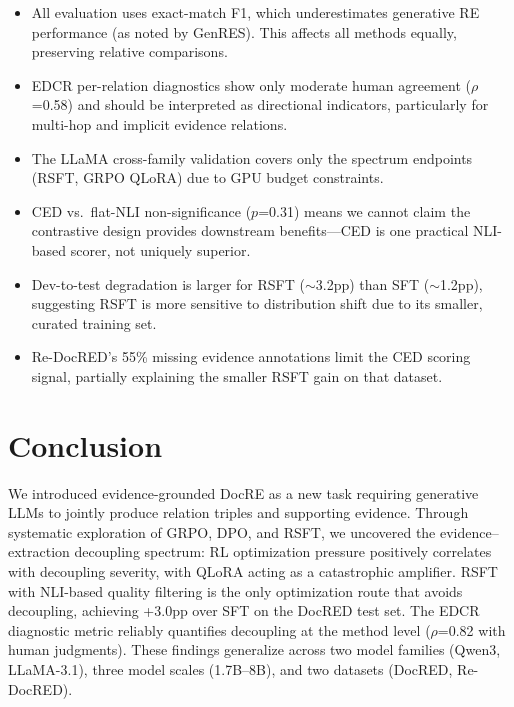 \documentclass[11pt,a4paper]{article}
\begin{document}
\begin{itemize}
\item All evaluation uses exact-match F1, which underestimates generative RE performance (as noted by GenRES). This affects all methods equally, preserving relative comparisons.
\item EDCR per-relation diagnostics show only moderate human agreement ($\rho$=0.58) and should be interpreted as directional indicators, particularly for multi-hop and implicit evidence relations.
\item The LLaMA cross-family validation covers only the spectrum endpoints (RSFT, GRPO QLoRA) due to GPU budget constraints.
\item CED vs.\ flat-NLI non-significance ($p$=0.31) means we cannot claim the contrastive design provides downstream benefits---CED is one practical NLI-based scorer, not uniquely superior.
\item Dev-to-test degradation is larger for RSFT ($\sim$3.2pp) than SFT ($\sim$1.2pp), suggesting RSFT is more sensitive to distribution shift due to its smaller, curated training set.
\item Re-DocRED's 55\% missing evidence annotations limit the CED scoring signal, partially explaining the smaller RSFT gain on that dataset.
\end{itemize}

\section{Conclusion}
\label{sec:conclusion}

We introduced evidence-grounded DocRE as a new task requiring generative LLMs to jointly produce relation triples and supporting evidence. Through systematic exploration of GRPO, DPO, and RSFT, we uncovered the evidence--extraction decoupling spectrum: RL optimization pressure positively correlates with decoupling severity, with QLoRA acting as a catastrophic amplifier. RSFT with NLI-based quality filtering is the only optimization route that avoids decoupling, achieving +3.0pp over SFT on the DocRED test set. The EDCR diagnostic metric reliably quantifies decoupling at the method level ($\rho$=0.82 with human judgments). These findings generalize across two model families (Qwen3, LLaMA-3.1), three model scales (1.7B--8B), and two datasets (DocRED, Re-DocRED).

\appendix
\end{document}
